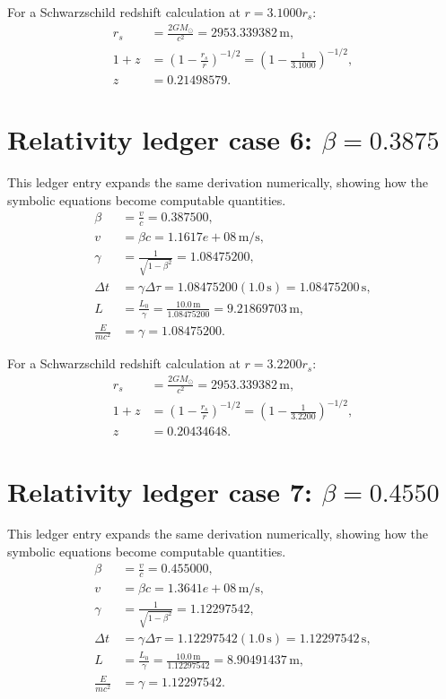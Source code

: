 \documentclass[11pt,a4paper]{article}
\begin{document}
For a Schwarzschild redshift calculation at $r=3.1000r_s$:
\begin{align}
r_s &= \frac{2GM_\odot}{c^2}=2953.339382\,\mathrm{m},\\
1+z &= \left(1-\frac{r_s}{r}\right)^{-1/2}
=\left(1-\frac{1}{3.1000}\right)^{-1/2},\\
z&=0.21498579.
\end{align}

\section{Relativity ledger case 6: $\beta=0.3875$}
This ledger entry expands the same derivation numerically, showing how the symbolic equations become computable quantities.
\begin{align}
\beta &= \frac{v}{c}=0.387500,\\
v &= \beta c = 1.1617e+08\,\mathrm{m/s},\\
\gamma &= \frac{1}{\sqrt{1-\beta^2}} = 1.08475200,\\
\Delta t &= \gamma\Delta\tau = 1.08475200(1.0\,\mathrm{s}) = 1.08475200\,\mathrm{s},\\
L &= \frac{L_0}{\gamma} = \frac{10.0\,\mathrm{m}}{1.08475200} = 9.21869703\,\mathrm{m},\\
\frac{E}{mc^2}&=\gamma=1.08475200.
\end{align}

For a Schwarzschild redshift calculation at $r=3.2200r_s$:
\begin{align}
r_s &= \frac{2GM_\odot}{c^2}=2953.339382\,\mathrm{m},\\
1+z &= \left(1-\frac{r_s}{r}\right)^{-1/2}
=\left(1-\frac{1}{3.2200}\right)^{-1/2},\\
z&=0.20434648.
\end{align}

\newpage

\section{Relativity ledger case 7: $\beta=0.4550$}
This ledger entry expands the same derivation numerically, showing how the symbolic equations become computable quantities.
\begin{align}
\beta &= \frac{v}{c}=0.455000,\\
v &= \beta c = 1.3641e+08\,\mathrm{m/s},\\
\gamma &= \frac{1}{\sqrt{1-\beta^2}} = 1.12297542,\\
\Delta t &= \gamma\Delta\tau = 1.12297542(1.0\,\mathrm{s}) = 1.12297542\,\mathrm{s},\\
L &= \frac{L_0}{\gamma} = \frac{10.0\,\mathrm{m}}{1.12297542} = 8.90491437\,\mathrm{m},\\
\frac{E}{mc^2}&=\gamma=1.12297542.
\end{align}
\end{document}
